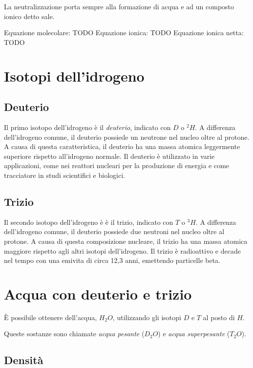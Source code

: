 \documentclass[a4paper]{article}
\begin{document}
La neutralizzazione porta sempre alla formazione di acqua
e ad un composto ionico detto sale.

Equazione molecolare: TODO
Equazione ionica: TODO
Equazione ionica netta: TODO

\pagebreak

\section{Isotopi dell'idrogeno}

\subsection{Deuterio}

Il primo isotopo dell'idrogeno è il \textit{deuterio}, indicato con \(D\) o \(^2H\).
A differenza dell'idrogeno comune, il deuterio possiede un neutrone nel nucleo oltre al protone.
A causa di questa caratteristica, il deuterio ha una massa atomica leggermente superiore rispetto all'idrogeno normale.
Il deuterio è utilizzato in varie applicazioni, come nei reattori nucleari per la produzione di energia e come tracciatore in studi scientifici e biologici. 

\subsection{Trizio}

Il secondo isotopo dell'idrogeno è è il trizio, indicato con \(T\) o \(^3H\).
A differenza dell'idrogeno comune, il deuterio possiede due neutroni nel nucleo oltre al protone.
A causa di questa composizione nucleare, il trizio ha una massa atomica maggiore rispetto agli altri isotopi dell'idrogeno.
Il trizio è radioattivo e decade nel tempo con una emivita di circa 12,3 anni, emettendo particelle beta.

\section{Acqua con deuterio e trizio}

È possibile ottenere dell'acqua, \(H_2O\), utilizzando gli isotopi \(D\) e \(T\) al posto di \(H\).

Queste sostanze sono chiamate \textit{acqua pesante} (\(D_2O\)) e
\textit{acqua superpesante} (\(T_2O\)).

\subsection{Densità}
\end{document}
